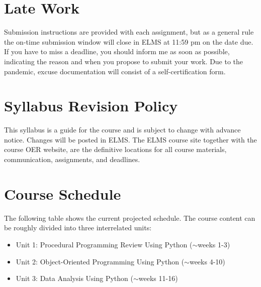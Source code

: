 \documentclass[11pt]{article}
\begin{document}
\section{Late Work}
Submission instructions are provided with each assignment, but as a general rule the on-time submission window will close in ELMS at 11:59 pm on the date due. If you have to miss a deadline, you should inform me as soon as possible, indicating the reason and when you propose to submit your work. Due to the pandemic, excuse documentation will consist of a self-certification form.

\section{Syllabus Revision Policy}
This syllabus is a guide for the course and is subject to change with advance notice. Changes will be posted in ELMS. The ELMS course site together with the course OER website, are the definitive locations for all course materials, communication, assignments, and deadlines.

\section{Course Schedule}
The following table shows the current projected schedule. The course content can be roughly divided into three interrelated units:

\begin{itemize}
	\item Unit 1: Procedural Programming Review Using Python ($\sim$weeks 1-3)
	\item Unit 2: Object-Oriented Programming Using Python ($\sim$weeks 4-10)
	\item Unit 3: Data Analysis Using Python ($\sim$weeks 11-16)
\end{itemize}
\end{document}
